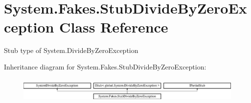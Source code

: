 \hypertarget{class_system_1_1_fakes_1_1_stub_divide_by_zero_exception}{\section{System.\-Fakes.\-Stub\-Divide\-By\-Zero\-Exception Class Reference}
\label{class_system_1_1_fakes_1_1_stub_divide_by_zero_exception}
}


Stub type of System.\-Divide\-By\-Zero\-Exception 


Inheritance diagram for System.\-Fakes.\-Stub\-Divide\-By\-Zero\-Exception\-:\begin{figure}[H]
\begin{center}
\leavevmode
\includegraphics[height=1.296296cm]{class_system_1_1_fakes_1_1_stub_divide_by_zero_exception}
\end{center}
\end{figure}
